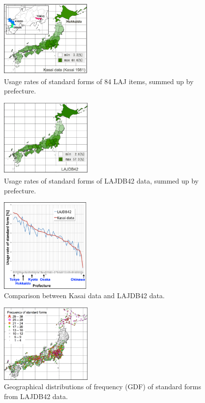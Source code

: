 \documentclass[output=paper]{LSP/langsci}
\begin{document}
\begin{figure}
\includegraphics[width=0.4\textwidth]{illustrations/kuma_fig03}
\caption{Usage rates of standard forms of 84 LAJ items, summed up by prefecture.}          
\label{fig:3}
\end{figure} 
\begin{figure}
\includegraphics[width=0.4\textwidth]{illustrations/kuma_fig04}
\caption{Usage rates of standard forms of LAJDB42 data, summed up by prefecture.}          
\label{fig:4}
\end{figure} 
\begin{figure}
\includegraphics[width=0.4\textwidth]{illustrations/kuma_fig05}
\caption{Comparison between Kasai data and LAJDB42 data.}    
\label{fig:5}
\end{figure} 
\begin{figure}
\includegraphics[width=0.4\textwidth]{illustrations/kuma_fig06}
\caption{Geographical distributions of frequency (GDF) of standard forms from LAJDB42 data.}          
\label{fig:6}
\end{figure} 
\end{document}
